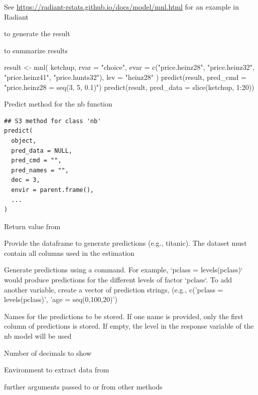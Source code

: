 \documentclass[a4paper]{book}
\begin{document}
%
\begin{Details}
See \url{https://radiant-rstats.github.io/docs/model/mnl.html} for an example in Radiant
\end{Details}
%
\begin{SeeAlso}
 to generate the result

 to summarize results
\end{SeeAlso}
%
\begin{Examples}
\begin{ExampleCode}
result <- mnl(
  ketchup,
  rvar = "choice",
  evar = c("price.heinz28", "price.heinz32", "price.heinz41", "price.hunts32"),
  lev = "heinz28"
)
predict(result, pred_cmd = "price.heinz28 = seq(3, 5, 0.1)")
predict(result, pred_data = slice(ketchup, 1:20))

\end{ExampleCode}
\end{Examples}
%
\begin{Description}
Predict method for the nb function
\end{Description}
%
\begin{Usage}
\begin{verbatim}
## S3 method for class 'nb'
predict(
  object,
  pred_data = NULL,
  pred_cmd = "",
  pred_names = "",
  dec = 3,
  envir = parent.frame(),
  ...
)
\end{verbatim}
\end{Usage}
%
\begin{Arguments}
\begin{ldescription}
\item[\code{object}] Return value from 

\item[\code{pred\_data}] Provide the dataframe to generate predictions (e.g., titanic). The dataset must contain all columns used in the estimation

\item[\code{pred\_cmd}] Generate predictions using a command. For example, `pclass = levels(pclass)` would produce predictions for the different levels of factor `pclass`. To add another variable, create a vector of prediction strings, (e.g., c('pclass = levels(pclass)', 'age = seq(0,100,20)')

\item[\code{pred\_names}] Names for the predictions to be stored. If one name is provided, only the first column of predictions is stored. If empty, the level in the response variable of the nb model will be used

\item[\code{dec}] Number of decimals to show

\item[\code{envir}] Environment to extract data from

\item[\code{...}] further arguments passed to or from other methods
\end{ldescription}
\end{Arguments}
\end{document}

